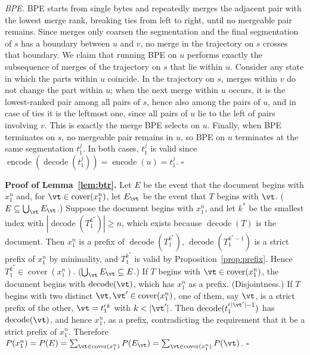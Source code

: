 \documentclass{article} %
\newcommand{\enc}{\operatorname{encode}}
\newcommand{\dec}{\operatorname{decode}}
\newcommand{\cover}{\operatorname{cover}}
\begin{document}
\emph{BPE.} BPE starts from single bytes and repeatedly merges the adjacent pair with the lowest merge rank, breaking ties from left to right, until no mergeable pair remains. Since merges only coarsen the segmentation and the final segmentation of $s$ has a boundary between $u$ and $v$, no merge in the trajectory on $s$ crosses that boundary. We claim that running BPE on $u$ performs exactly the subsequence of merges of the trajectory on $s$ that lie within $u$. Consider any state in which the parts within $u$ coincide. In the trajectory on $s$, merges within $v$ do not change the part within $u$; when the next merge within $u$ occurs, it is the lowest-ranked pair among all pairs of $s$, hence also among the pairs of $u$, and in case of ties it is the leftmost one, since all pairs of $u$ lie to the left of pairs involving $v$. This is exactly the merge BPE selects on $u$. Finally, when BPE terminates on $s$, no mergeable pair remains in $u$, so BPE on $u$ terminates at the same segmentation $t_1^j$. In both cases, $t_1^j$ is valid since $\enc(\dec(t_1^j))=\enc(u)=t_1^j$. \hfill$\square$

\textbf{Proof of Lemma~\ref{lem:btr}.}
Let $E$ be the event that the document begins with $x_1^n$ and, for $\vt\in\cover(x_1^n)$, let $E_{\vt}$ be the event that $T$ begins with $\vt$.
($E\subseteq\bigcup_{\vt}E_{\vt}$.) Suppose the document begins with $x_1^n$, and let $k^*$ be the smallest index with $|\dec(T_1^{k^*})|\geq n$, which exists because $\dec(T)$ is the document. Then $x_1^n$ is a prefix of $\dec(T_1^{k^*})$, $\dec(T_1^{k^*-1})$ is a strict prefix of $x_1^n$ by minimality, and $T_1^{k^*}$ is valid by Proposition~\ref{prop:prefix}. Hence $T_1^{k^*}\in\cover(x_1^n)$.
($\bigcup_{\vt}E_{\vt}\subseteq E$.) If $T$ begins with $\vt\in\cover(x_1^n)$, the document begins with $\dec(\vt)$, which has $x_1^n$ as a prefix.
(Disjointness.) If $T$ begins with two distinct $\vt,\vt'\in\cover(x_1^n)$, one of them, say $\vt$, is a strict prefix of the other, $\vt=t_1'^{\,k}$ with $k<|\vt'|$. Then $\dec(t_1'^{\,|\vt'|-1})$ has $\dec(\vt)$, and hence $x_1^n$, as a prefix, contradicting the requirement that it be a strict prefix of $x_1^n$.
Therefore $P(x_1^n)=P(E)=\sum_{\vt\in\cover(x_1^n)}P(E_{\vt})=\sum_{\vt\in\cover(x_1^n)}P(\vt)$. \hfill$\square$
\end{document}
